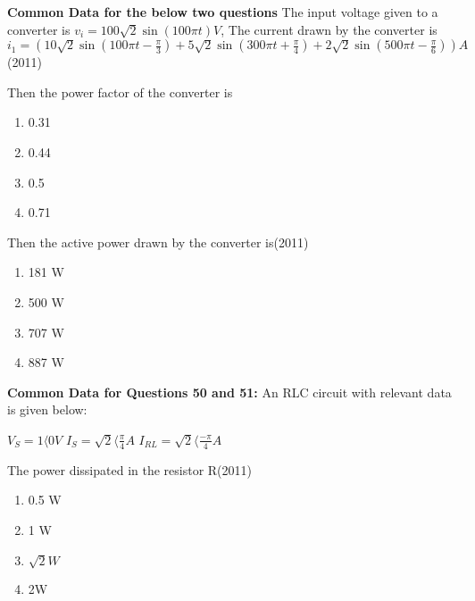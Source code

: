 \textbf{Common Data for the below two questions }
The input voltage given to a converter is $v_i=100\sqrt{2} \sin(100\pi t)V$, The current drawn by the converter is $i_1=(10\sqrt{2} \sin (100\pi t-\frac{\pi}{3})+5\sqrt{2} \sin (300\pi t+\frac{\pi}{4})+2\sqrt{2}\sin (500\pi t-\frac{\pi}{6}))A$\hfill{(2011)}
    \item Then the power factor  of the converter is 
    \begin{multicols}{4}
            \begin{enumerate}
        \item 0.31
\item 0.44
\item  0.5
\item 0.71
            \end{enumerate}
        \end{multicols}
 

 
\item Then the active power drawn by the converter is\hfill{(2011)}
    \begin{multicols}{4}
            \begin{enumerate}
              \item 181 W
              \item  500 W
              \item  707 W
              \item 887 W
            \end{enumerate}
        \end{multicols}
        \textbf{Common Data for Questions 50 and 51:}
        An RLC circuit with relevant data is given below:
        
        $V_S=1\langle 0 V$
        $I_S=\sqrt{2}\langle \frac{\pi}{4}A$
        $I_{RL}=\sqrt{2}\langle \frac{-\pi}{4}A$
    
     
\item The power dissipated in the resistor R\hfill{(2011)}
    \begin{multicols}{4}
            \begin{enumerate}
              \item  0.5 W
              \item 1 W
              \item $\sqrt{2} W$
              \item 2W 
            \end{enumerate}
        \end{multicols}
    
